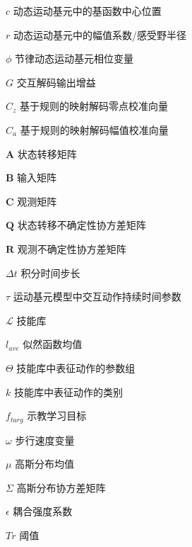 \begin{notation}
\begin{notationlist}{2em}
    \item[$\displaystyle c$] 动态运动基元中的基函数中心位置
    \item[$\displaystyle r$] 动态运动基元中的幅值系数/感受野半径
    \item[$\displaystyle \phi$] 节律动态运动基元相位变量
    \item[$\displaystyle G$] 交互解码输出增益
    \item[$\displaystyle C_z$] 基于规则的映射解码零点校准向量
    \item[$\displaystyle C_a$] 基于规则的映射解码幅值校准向量
    \item[$\displaystyle \boldsymbol{A}$] 状态转移矩阵
    \item[$\displaystyle \boldsymbol{B}$] 输入矩阵
    \item[$\displaystyle \boldsymbol{C}$] 观测矩阵
    \item[$\displaystyle \boldsymbol{Q}$] 状态转移不确定性协方差矩阵
    \item[$\displaystyle \boldsymbol{R}$] 观测不确定性协方差矩阵
    \item[$\displaystyle \Delta t$] 积分时间步长
    \item[$\displaystyle \tau$] 运动基元模型中交互动作持续时间参数
    \item[$\displaystyle \mathscr{L}$] 技能库
    \item[$\displaystyle l_{ave}$] 似然函数均值
    \item[$\displaystyle \Theta$] 技能库中表征动作的参数组
    \item[$\displaystyle k$] 技能库中表征动作的类别
    \item[$\displaystyle f_{targ}$] 示教学习目标
    \item[$\displaystyle \omega$] 步行速度变量
    \item[$\displaystyle \mu$] 高斯分布均值
    \item[$\displaystyle \Sigma$] 高斯分布协方差矩阵
    \item[$\displaystyle \epsilon$] 耦合强度系数
    \item[$\displaystyle Tr$] 阈值
    
  \end{notationlist}

\end{notation}





